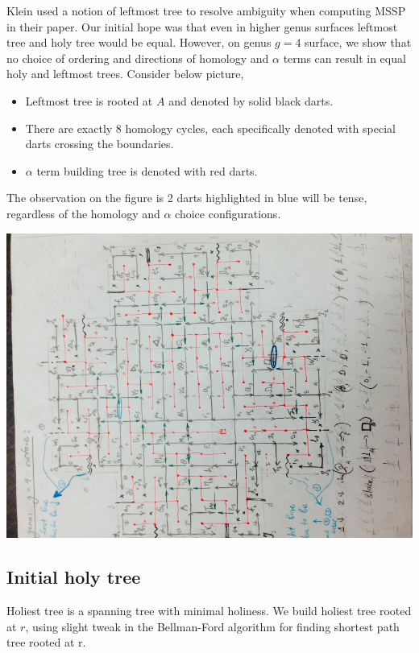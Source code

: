 \documentclass{article}
\begin{document}
Klein \cite{klein2005multiple} used a notion of leftmost tree to resolve ambiguity when 
computing MSSP in their paper.
Our initial hope was that even in higher genus surfaces leftmost tree and holy
tree would be equal. However, on genus $g = 4$ surface, we show that no
choice of ordering and directions of homology and $\alpha$ terms can result in equal holy and
leftmost trees. Consider below picture, \\
\begin{itemize}
\item Leftmost tree is rooted at $A$ and denoted by solid black darts.
\item There are exactly 8 homology cycles, each specifically denoted with
special darts crossing the boundaries.
\item $\alpha$ term building tree is denoted with red darts.
\end{itemize}
The observation on the figure is 2 darts highlighted in blue will be tense, 
regardless of the homology and $\alpha$ choice configurations.
\begin{center}
\includegraphics[angle = -90, scale = 0.7]{figures/Genus4_InitialHolyTree.jpg}
\end{center}

\subsection{Initial holy tree}
Holiest tree is a spanning tree with minimal holiness. We build holiest tree 
rooted at $r$, using slight tweak in the Bellman-Ford algorithm for finding 
shortest path tree rooted at r. \\
\end{document}
